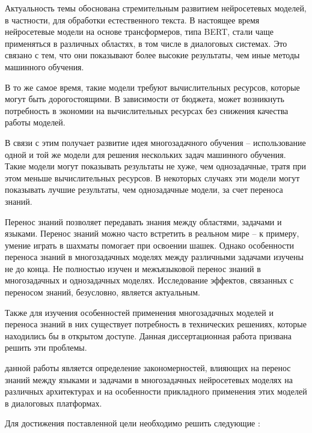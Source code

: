 {\actuality} 
Актуальность темы обоснована стремительным развитием нейросетевых моделей, в частности, для обработки естественного текста.
В настоящее время нейросетевые модели на основе трансформеров, типа BERT, стали чаще применяться в различных областях, в том числе в диалоговых системах. Это связано с тем, что они показывают более высокие результаты, чем иные методы машинного обучения. 

В то же самое время, такие модели требуют вычислительных ресурсов, которые могут быть дорогостоящими. В зависимости от бюджета, может возникнуть потребность в экономии на вычислительных ресурсах без снижения качества работы моделей.

В связи с этим получает развитие идея многозадачного обучения -- использование одной и той же модели для решения нескольких задач машинного обучения. Такие модели могут показывать результаты не хуже, чем однозадачные, тратя при этом меньше вычислительных ресурсов. В некоторых случаях эти модели могут показывать лучшие результаты, чем однозадачные модели, за счет переноса знаний.

Перенос знаний позволяет передавать знания между областями, задачами и языками. Перенос знаний можно часто встретить в реальном мире -- к примеру, умение играть в шахматы помогает при освоении шашек. Однако особенности переноса знаний в многозадачных моделях между различными задачами изучены не до конца. Не полностью изучен и межъязыковой перенос знаний в многозадачных и однозадачных моделях. Исследование эффектов, связанных с переносом знаний, безусловно, является актуальным.

Также для изучения особенностей применения многозадачных моделей и переноса знаний в них существует потребность в технических решениях, которые находились бы в открытом доступе. Данная диссертационная работа призвана решить эти проблемы.


{\aim} данной работы является определение закономерностей, влияющих на перенос знаний между языками и задачами в многозадачных нейросетевых моделях на различных архитектурах и на особенности прикладного применения этих моделей в диалоговых платформах.

Для достижения поставленной цели необходимо решить следующие {\tasks}: %

